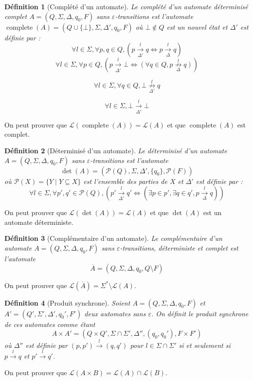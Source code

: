 \documentclass[conference]{IEEEtran}
\newtheorem{mydef}{D\'efinition}
\begin{document}
\begin{mydef}[Compl\'et\'e d'un automate]
Le compl\'et\'e d'un automate déterminisé complet $A = (Q, \Sigma, \Delta, q_0, F)$ sans $\varepsilon$-transitions est l'automate $\operatorname{complete}(A) = (Q\cup\{\bot\}, \Sigma, \Delta', q_0, F)$ o\`u $\bot\not\in Q$ est un nouvel \'etat et $\Delta'$ est d\'efinie par :
$$\forall l \in \Sigma,\forall p,q \in Q, \left(p\underset{\Delta'}{\overset{l}{{\to}}}q \iff p\underset{\Delta}{\overset{l}{{\to}}}q\right)$$
$$\forall l \in \Sigma, \forall p \in Q, \left(p\underset{\Delta'}{\overset{l}{{\to}}}\bot \iff \left(\forall q \in Q, p\underset{\Delta}{\overset{l}{{\not\to}}}q\right)\right)$$

$$\forall l \in \Sigma, \forall q \in Q,\bot\underset{\Delta'}{\overset{l}{{\not\to}}}q$$

$$\forall l \in \Sigma, \bot\underset{\Delta'}{\overset{l}{{\to}}}\bot$$
\end{mydef}

On peut prouver que $\mathcal L(\operatorname{complete}(A)) = \mathcal L(A)$ et que $\operatorname{complete}(A)$ est complet.

\begin{mydef}[D\'eterminis\'e d'un automate]
Le d\'eterminis\'e d'un automate $A = (Q, \Sigma, \Delta, q_0, F)$ sans $\varepsilon$-transitions est l'automate $$\det(A) = (\mathcal P(Q), \Sigma, \Delta', \{q_0\}, \mathcal P(F))$$ o\`u $\mathcal P(X)=\{Y\mid Y \subseteq X\}$ est l'ensemble des parties de $X$ et $\Delta'$ est d\'efinie par :
$$\forall l \in \Sigma,\forall p',q' \in \mathcal P(Q), \left(p'\underset{\Delta'}{\overset{l}{{\to}}}q' \iff \left( \exists p \in p', \exists q \in q', p\underset{\Delta}{\overset{l}{{\to}}}q\right)\right)$$
\end{mydef}

On peut prouver que $\mathcal L(\det(A))=\mathcal L(A)$ et que $\det(A)$ est un automate d\'eterministe.

\begin{mydef}[Compl\'ementaire d'un automate]
Le compl\'ementaire d'un automate $A = (Q, \Sigma, \Delta, q_0, F)$ sans $\varepsilon$-transitions, d\'eterministe et complet est l'automate $$\overline{A} = (Q, \Sigma, \Delta, q_0, Q\setminus F)$$
\end{mydef}

On peut prouver que $\mathcal L\left(\overline{A}\right) = \Sigma^* \setminus \mathcal L(A)$.

\begin{mydef}[Produit synchrone]
Soient $A = (Q, \Sigma, \Delta, q_0, F)$ et $A' = (Q', \Sigma', \Delta', q_0', F')$ deux automates sans $\varepsilon$. On définit le produit synchrone de ces automates comme \'etant $$A\times A' = (Q \times Q', \Sigma \cap \Sigma', \Delta'', (q_0, q_0'), F\times F')$$ o\`u $\Delta''$ est d\'efinie par $(p,p')\overset{l}{{\to}}(q,q')$ pour $l\in \Sigma\cap \Sigma'$ si et seulement si $p\overset{l}{{\to}}q$ et $p'\overset{l}{{\to}}q'$.
\end{mydef}
On peut prouver que $\mathcal L(A\times B) = \mathcal L(A) \cap \mathcal L(B)$.
\end{document}
